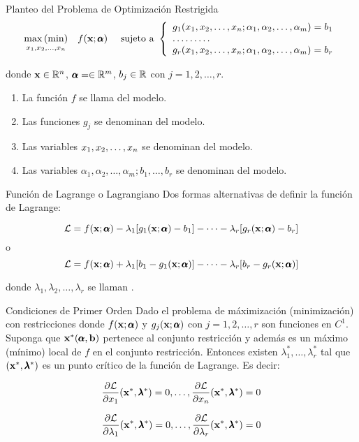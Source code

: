 \documentclass[10pt,aspectratio=169]{beamer}  %
\begin{document}
\begin{frame}{Planteo del Problema de Optimización Restrigida}
	\[
		\underset{x_1, x_2, \dots, x_n}{\max \, (\min)} \quad  f(\mathbf{x}; \pmb{\alpha}) \quad \text{ sujeto a } \left\{ \begin{array}{l} g_1(x_1, x_2, \dots, x_n; \alpha_1, \alpha_2, \dots, \alpha_m) = b_1
		\\ \dots \dots \dots \\ g_r(x_1, x_2, \dots, x_n; \alpha_1, \alpha_2, \dots, \alpha_m) = b_r \end{array} \right.
	\]
	
	donde $\mathbf{x} \in \mathbb{R}^n$, $\pmb{\alpha} = \in \mathbb{R}^m$, $b_j \in \mathbb{R}$ con $j = 1, 2, \dots, r$.
	\vspace{5pt}
	\begin{enumerate}
		\item La función $f$ se llama  del modelo.
		\item Las funciones $g_j$ se denominan  del modelo. 
		\item Las variables $x_1, x_2, \dots, x_n$ se denominan  del modelo.
		\item Las variables $\alpha_1, \alpha_2, \dots, \alpha_m; b_1, \dots, b_r$ se denominan  del modelo.
	\end{enumerate}

\end{frame}

\begin{frame}{Función de Lagrange o Lagrangiano}
	Dos formas alternativas de definir la función de Lagrange:

	\[
		\mathcal{L} = f(\mathbf{x}; \pmb{\alpha}) - \lambda_1 [g_1(\mathbf{x}; \pmb{\alpha}) - b_1] - \cdots - \lambda_r [g_r(\mathbf{x}; \pmb{\alpha}) - b_r]
	\]
	o
	\[
		\mathcal{L} = f(\mathbf{x}; \pmb{\alpha}) + \lambda_1 [b_1 - g_1(\mathbf{x}; \pmb{\alpha})] - \cdots - \lambda_r [b_r - g_r(\mathbf{x}; \pmb{\alpha})]
	\]

	donde $\lambda_1, \lambda_2, \dots, \lambda_r$ se llaman .

\end{frame}


\begin{frame}{Condiciones de Primer Orden}
	Dado el problema de máximización (minimización) con restricciones donde $f(\mathbf{x}; \pmb{\alpha})$ y $g_j(\mathbf{x}; \pmb{\alpha})$ con
	$j = 1, 2, \dots, r$ son funciones en $C^1$. Suponga que $\mathbf{x}^*(\pmb{\alpha}, \mathbf{b})$ pertenece al conjunto restricción
	y además es un máximo (mínimo) local de $f$ en el conjunto restricción. Entonces existen $\lambda_{1}^{*}, \dots, \lambda_{r}^{*}$
	tal que $(\mathbf{x}^*, \pmb{\lambda}^*)$ es un punto crítico de la función de Lagrange. Es decir:
	
	\[  \frac{\partial \mathcal{L}}{\partial x_1}(\mathbf{x}^*, \pmb{\lambda}^*) = 0, \dots, \frac{\partial \mathcal{L}}{\partial x_n}(\mathbf{x}^*, \pmb{\lambda}^*) = 0\]
	
	\[  \frac{\partial \mathcal{L}}{\partial \lambda_1}(\mathbf{x}^*, \pmb{\lambda}^*) = 0, \dots, \frac{\partial \mathcal{L}}{\partial \lambda_r}(\mathbf{x}^*, \pmb{\lambda}^*) = 0\]
\end{frame}
\end{document}
